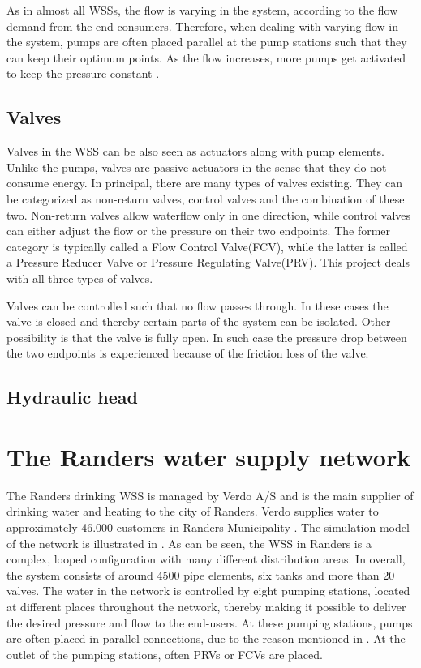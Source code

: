 As in almost all WSSs, the flow is varying in the system, according to the flow demand from the end-consumers. Therefore, when dealing with varying flow in the system, pumps are often placed parallel at the pump stations such that they can keep their optimum points. As the flow increases, more pumps get activated to keep the pressure constant \cite{kenneth_houe}. 

\subsection{Valves}
\label{valves}

Valves in the WSS can be also seen as actuators along with pump elements. Unlike the pumps, valves are passive actuators in the sense that they do not consume energy. In principal, there are many types of valves existing. They can be categorized as non-return valves, control valves and the combination of these two. Non-return valves allow waterflow only in one direction, while control valves can either adjust the flow or the pressure on their two endpoints. The former category is typically called a Flow Control Valve(FCV), while the latter is called a Pressure Reducer Valve or Pressure Regulating Valve(PRV). This project deals with all three types of valves. 

Valves can be controlled such that no flow passes through. In these cases the valve is closed and thereby certain parts of the system can be isolated. Other possibility is that the valve is fully open. In such case the pressure drop between the two endpoints is experienced because of the friction loss of the valve. 

\subsection{Hydraulic head}
\label{hydraulic_head}

\section{The Randers water supply network}
\label{the_randers_water_supply_network}

The Randers drinking WSS is managed by Verdo A/S and is the main supplier of drinking water and heating to the city of Randers. Verdo supplies water to approximately 46.000 customers in Randers Municipality \cite{verdo}. The simulation model of the network is illustrated in . As can be seen, the WSS in Randers is a complex, looped configuration with many different distribution areas. In overall, the system consists of around 4500 pipe elements, six tanks and more than 20 valves. The water in the network is controlled by eight pumping stations, located at different places throughout the network, thereby making it possible to deliver the desired pressure and flow to the end-users. At these pumping stations, pumps are often placed in parallel connections, due to the reason mentioned in . At the outlet of the pumping stations, often PRVs or FCVs are placed. 


